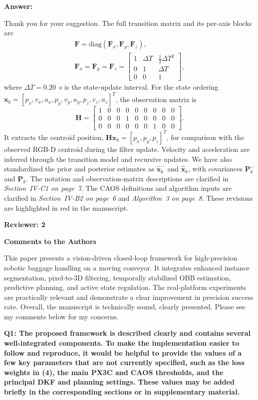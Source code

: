 \documentclass[journal,10pt]{IEEEtran}
\newcommand{\reviewer}[1]{%
  \par\smallskip\noindent
  \textcolor{responseblue}{\textbf{#1\hspace{0.2em}}}\par\nobreak%
}
\newcommand{\question}[2]{%
  \par\smallskip\noindent
  {\color{responseblue}\bfseries\clubpenalty=10000\widowpenalty=10000 Q#1: #2\par}%
  \par\nobreak\noindent
}
\newcommand{\answer}{%
  \par\smallskip\noindent
  \textbf{Answer: }\ignorespaces
}
\newcommand{\reviewercomments}{%
  \par\smallskip\noindent
  {\color{responseblue}\bfseries Comments to the Authors\par\nobreak}%
  \noindent\ignorespaces
}
\begin{document}
\answer
Thank you for your suggestion. The full transition matrix and its per-axis blocks are
\begin{gather*}
\boldsymbol{F}=\mathrm{diag}(\boldsymbol{F}_x,\boldsymbol{F}_y,\boldsymbol{F}_z),\\
\boldsymbol{F}_x=\boldsymbol{F}_y=\boldsymbol{F}_z=
\begin{bmatrix}
1 & \Delta T & \frac{1}{2}\Delta T^2\\
0 & 1 & \Delta T\\
0 & 0 & 1
\end{bmatrix},
\end{gather*}
where $\Delta T=0.20$~s is the state-update interval. For the state ordering $\boldsymbol{x}_k=[p_x,v_x,a_x,p_y,v_y,a_y,p_z,v_z,a_z]^T$, the observation matrix is
\[
\boldsymbol{H}=\begin{bmatrix}
1&0&0&0&0&0&0&0&0\\
0&0&0&1&0&0&0&0&0\\
0&0&0&0&0&0&1&0&0
\end{bmatrix}.
\]
It extracts the centroid position, $\boldsymbol{H}\boldsymbol{x}_k=[p_x,p_y,p_z]^T$, for comparison with the observed RGB-D centroid during the filter update. Velocity and acceleration are inferred through the transition model and recursive updates. We have also standardized the prior and posterior estimates as $\hat{\boldsymbol{x}}_k^{-}$ and $\hat{\boldsymbol{x}}_k$, with covariances $\boldsymbol{P}_k^{-}$ and $\boldsymbol{P}_k$. The notation and observation-matrix descriptions are clarified in \textit{Section~IV-C1 on page~7}. The CAOS definitions and algorithm inputs are clarified in \textit{Section~IV-B2 on page~6} and \textit{Algorithm~3 on page~8}. These revisions are highlighted in red in the manuscript.

\reviewer{Reviewer: 2}

\reviewercomments
This paper presents a vision-driven closed-loop framework for high-precision robotic baggage handling on a moving conveyor. It integrates enhanced instance segmentation, pixel-to-3D filtering, temporally stabilized OBB estimation, predictive planning, and active state regulation. The real-platform experiments are practically relevant and demonstrate a clear improvement in precision success rate. Overall, the manuscript is technically sound, clearly presented. Please see my comments below for my concerns.

\question{1}{The proposed framework is described clearly and contains several well-integrated components. To make the implementation easier to follow and reproduce, it would be helpful to provide the values of a few key parameters that are not currently specified, such as the loss weights in (4), the main PX3C and CAOS thresholds, and the principal DKF and planning settings. These values may be added briefly in the corresponding sections or in supplementary material.}
\end{document}
